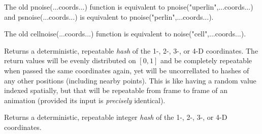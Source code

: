 \documentclass[11pt,letterpaper]{book}
\begin{document}

The old {\cf pnoise(...coords...)} function is equivalent to
{\cf pnoise("uperlin",...coords...)} and {\cf psnoise(...coords...)}
is equivalent to {\cf pnoise("perlin",...coords...)}.
\apiend

The old {\cf cellnoise(...coords...)} function is equivalent to
{\cf noise("cell",...coords...)}.
\apiend

Returns a deterministic, repeatable \emph{hash} of the 1-, 2-, 3-, or
4-D coordinates.  The return values will be evenly
distributed on $[0,1]$ and be completely repeatable when passed the same
coordinates again, yet will be uncorrellated to hashes of any other
positions (including nearby points).  This is like having a random value
indexed spatially, but that will be repeatable from frame to frame of an
animation (provided its input is \emph{precisely} identical).
\apiend

Returns a deterministic, repeatable integer \emph{hash} of the 1-, 2-, 3-,
or 4-D coordinates.
\apiend
\end{document}
